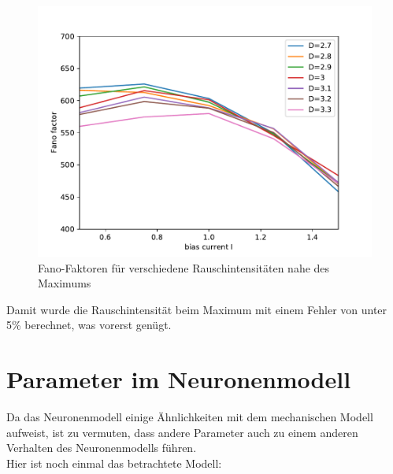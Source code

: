 \documentclass[12pt,a4paper]{article}
\begin{document}
\begin{figure}[H]
	\centering
	\includegraphics[scale=0.9]{fneurpmaxclose.pdf} 
	\caption{Fano-Faktoren für verschiedene Rauschintensitäten nahe des Maximums}
	\label{fnpmaxcl}
\end{figure} 
Damit wurde die Rauschintensität beim Maximum mit einem Fehler von unter 5\% berechnet, was vorerst genügt. 
\section{Parameter im Neuronenmodell}
Da das Neuronenmodell einige Ähnlichkeiten mit dem mechanischen Modell aufweist, ist zu vermuten, dass andere Parameter auch zu einem anderen Verhalten des Neuronenmodells führen. \\
Hier ist noch einmal das betrachtete Modell:
\end{document}

